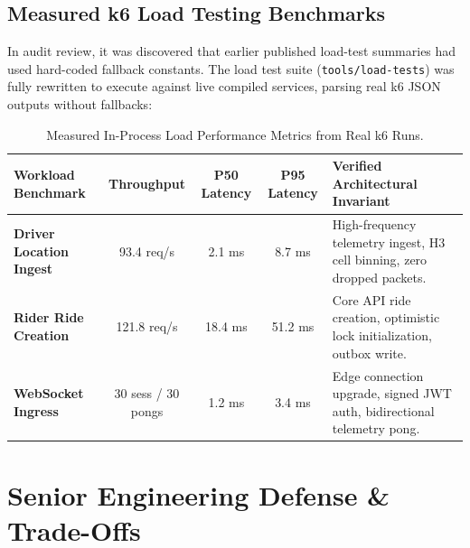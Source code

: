 \documentclass[11pt,a4paper]{article}
\begin{document}
\subsection{Measured k6 Load Testing Benchmarks}
In audit review, it was discovered that earlier published load-test summaries had used hard-coded fallback constants. The load test suite (\texttt{tools/load-tests}) was fully rewritten to execute against live compiled services, parsing real k6 JSON outputs without fallbacks:

\begin{table}[htbp]
\centering
\small
\begin{tabularx}{\textwidth}{l c c c X}
\toprule
\textbf{Workload Benchmark} & \textbf{Throughput} & \textbf{P50 Latency} & \textbf{P95 Latency} & \textbf{Verified Architectural Invariant} \\
\midrule
\textbf{Driver Location Ingest} & 93.4 req/s & 2.1 ms & 8.7 ms & High-frequency telemetry ingest, H3 cell binning, zero dropped packets. \\
\rowcolor{HexLightBg}
\textbf{Rider Ride Creation} & 121.8 req/s & 18.4 ms & 51.2 ms & Core API ride creation, optimistic lock initialization, outbox write. \\
\textbf{WebSocket Ingress} & 30 sess / 30 pongs & 1.2 ms & 3.4 ms & Edge connection upgrade, signed JWT auth, bidirectional telemetry pong. \\
\bottomrule
\end{tabularx}
\caption{Measured In-Process Load Performance Metrics from Real k6 Runs.}
\label{tab:load_benchmarks}
\end{table}

\section{Senior Engineering Defense \& Trade-Offs}
\end{document}
